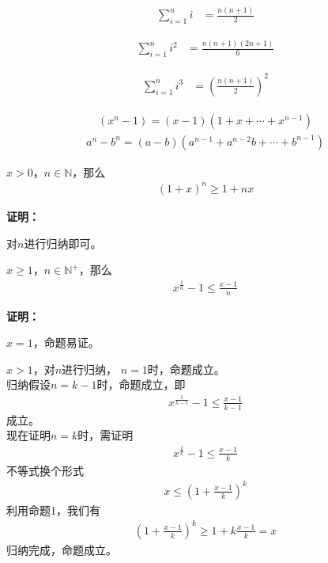 \documentclass{article}
\begin{document}
\begin{align*}
    \sum\limits_{i = 1}^n i & = \frac{n(n+1)}{2}
\end{align*}

\begin{align*}
    \sum\limits_{i = 1}^n i^2 & = \frac{n(n+1)(2n+1)}{6}
\end{align*}

\begin{align*}
    \sum\limits_{i = 1}^n i^3 & = \left(\frac{n(n+1)}{2}\right)^2
\end{align*}

\begin{align*}
    (x^n - 1) = (x - 1)(1 + x + \cdots + x^{n-1})
\end{align*}
\begin{align*}
    a^n - b^n = (a - b)(a^{n - 1} + a^{n - 2}b + \cdots + b^{n-1})
\end{align*}

\begin{zremark}
    $x > 0$，$n \in \mathbb{N}$，那么
    \begin{align*}
        (1 + x)^n \geq 1 + nx
    \end{align*}
\end{zremark}

\textbf{证明：}

对$n$进行归纳即可。

\begin{zremark}
    $x \geq 1$，$n \in \mathbb{N}^+$，那么
    \begin{align*}
        x^{\frac{1}{n}} - 1 \leq \frac{x - 1}{n}
    \end{align*}
\end{zremark}

\textbf{证明：}

$x = 1$，命题易证。

$x > 1$，对$n$进行归纳，
$n = 1$时，命题成立。\\
归纳假设$n = k - 1$时，命题成立，即
\begin{align*}
    x^{\frac{1}{k - 1}} - 1 \leq \frac{x - 1}{k - 1}
\end{align*}
成立。\\
现在证明$n = k$时，需证明
\begin{align*}
    x^{\frac{1}{k}} - 1 \leq \frac{x - 1}{k}
\end{align*}
不等式换个形式
\begin{align*}
    x \leq (1 + \frac{x - 1}{k})^k
\end{align*}
利用命题1，我们有
\begin{align*}
    (1 + \frac{x - 1}{k})^k \geq 1 + k \frac{x - 1}{k} = x
\end{align*}
归纳完成，命题成立。
\end{document}
